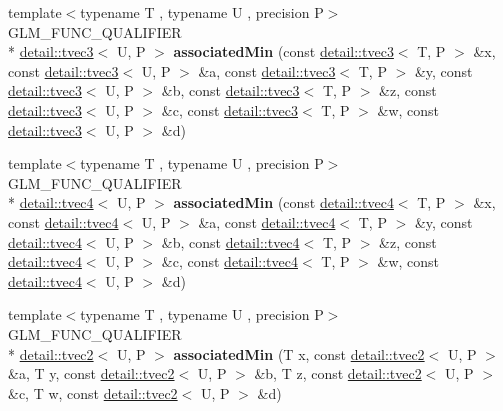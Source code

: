 \begin{DoxyCompactItemize}
\item 
\hypertarget{namespaceglm_a79286a03f67ccb6a58c5afa150cc77b3}{{\footnotesize template$<$typename T , typename U , precision P$>$ }\\G\-L\-M\-\_\-\-F\-U\-N\-C\-\_\-\-Q\-U\-A\-L\-I\-F\-I\-E\-R \\*
\hyperlink{structglm_1_1detail_1_1tvec3}{detail\-::tvec3}$<$ U, P $>$ {\bfseries associated\-Min} (const \hyperlink{structglm_1_1detail_1_1tvec3}{detail\-::tvec3}$<$ T, P $>$ \&x, const \hyperlink{structglm_1_1detail_1_1tvec3}{detail\-::tvec3}$<$ U, P $>$ \&a, const \hyperlink{structglm_1_1detail_1_1tvec3}{detail\-::tvec3}$<$ T, P $>$ \&y, const \hyperlink{structglm_1_1detail_1_1tvec3}{detail\-::tvec3}$<$ U, P $>$ \&b, const \hyperlink{structglm_1_1detail_1_1tvec3}{detail\-::tvec3}$<$ T, P $>$ \&z, const \hyperlink{structglm_1_1detail_1_1tvec3}{detail\-::tvec3}$<$ U, P $>$ \&c, const \hyperlink{structglm_1_1detail_1_1tvec3}{detail\-::tvec3}$<$ T, P $>$ \&w, const \hyperlink{structglm_1_1detail_1_1tvec3}{detail\-::tvec3}$<$ U, P $>$ \&d)}\label{namespaceglm_a79286a03f67ccb6a58c5afa150cc77b3}

\item 
\hypertarget{namespaceglm_a1c1dfb0ea33d7ecc9119cd528438a64c}{{\footnotesize template$<$typename T , typename U , precision P$>$ }\\G\-L\-M\-\_\-\-F\-U\-N\-C\-\_\-\-Q\-U\-A\-L\-I\-F\-I\-E\-R \\*
\hyperlink{structglm_1_1detail_1_1tvec4}{detail\-::tvec4}$<$ U, P $>$ {\bfseries associated\-Min} (const \hyperlink{structglm_1_1detail_1_1tvec4}{detail\-::tvec4}$<$ T, P $>$ \&x, const \hyperlink{structglm_1_1detail_1_1tvec4}{detail\-::tvec4}$<$ U, P $>$ \&a, const \hyperlink{structglm_1_1detail_1_1tvec4}{detail\-::tvec4}$<$ T, P $>$ \&y, const \hyperlink{structglm_1_1detail_1_1tvec4}{detail\-::tvec4}$<$ U, P $>$ \&b, const \hyperlink{structglm_1_1detail_1_1tvec4}{detail\-::tvec4}$<$ T, P $>$ \&z, const \hyperlink{structglm_1_1detail_1_1tvec4}{detail\-::tvec4}$<$ U, P $>$ \&c, const \hyperlink{structglm_1_1detail_1_1tvec4}{detail\-::tvec4}$<$ T, P $>$ \&w, const \hyperlink{structglm_1_1detail_1_1tvec4}{detail\-::tvec4}$<$ U, P $>$ \&d)}\label{namespaceglm_a1c1dfb0ea33d7ecc9119cd528438a64c}

\item 
\hypertarget{namespaceglm_a748b6d48ac3eee9b1fbf6c13bea30967}{{\footnotesize template$<$typename T , typename U , precision P$>$ }\\G\-L\-M\-\_\-\-F\-U\-N\-C\-\_\-\-Q\-U\-A\-L\-I\-F\-I\-E\-R \\*
\hyperlink{structglm_1_1detail_1_1tvec2}{detail\-::tvec2}$<$ U, P $>$ {\bfseries associated\-Min} (T x, const \hyperlink{structglm_1_1detail_1_1tvec2}{detail\-::tvec2}$<$ U, P $>$ \&a, T y, const \hyperlink{structglm_1_1detail_1_1tvec2}{detail\-::tvec2}$<$ U, P $>$ \&b, T z, const \hyperlink{structglm_1_1detail_1_1tvec2}{detail\-::tvec2}$<$ U, P $>$ \&c, T w, const \hyperlink{structglm_1_1detail_1_1tvec2}{detail\-::tvec2}$<$ U, P $>$ \&d)}\label{namespaceglm_a748b6d48ac3eee9b1fbf6c13bea30967}


\end{DoxyCompactItemize}

